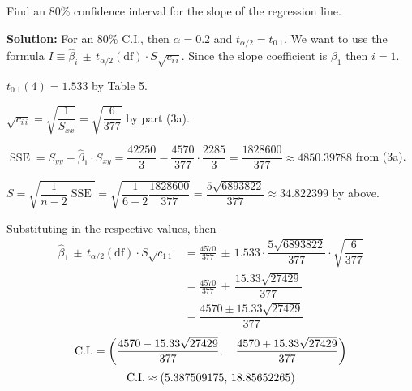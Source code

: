 Find an 80\% confidence interval for the slope of the regression line.

\nl \textbf{Solution: } For an 80\% C.I., then $\alpha = 0.2$ and $t_{\alpha/2} = t_{0.1}$. We want to use the formula $I \equiv \widehat{\beta}_i \,\pm\, t_{\alpha/2}(\text{df})\cdot S \sqrt{c_{i\,i}}$. Since the slope coefficient is $\beta_1$ then $i = 1$. 

\nl $t_{0.1}(4) = 1.533$ by Table 5.

\nl $\sqrt{c_{i\,i}} = \sqrt{\dfrac{1}{S_{xx}}} = \sqrt{\dfrac{6}{377}}$ by part (3a).

\nl $\operatorname{SSE} = S_{yy} - \widehat{\beta}_1 \cdot S_{xy} = \dfrac{42250}{3} - \dfrac{4570}{377}  \cdot \dfrac{2285}{3} = \dfrac{\num{1828600}}{377} \approx 4850.39788$ from (3a).

\nl $S = \sqrt{\dfrac{1}{n-2} \operatorname{SSE}} = \sqrt{\dfrac{1}{6-2} \dfrac{\num{1828600}}{377}} =  \dfrac{5\sqrt{\num{6893822}}}{377} \approx 34.822399$ by above.

\nnl Substituting in the respective values, then
\begin{align*}
    \widehat{\beta}_1 \,\pm\, t_{\alpha/2}(\text{df})\cdot S \sqrt{c_{1\,1}} &= \frac{4570}{377} \,\pm\, 1.533 \cdot \dfrac{5\sqrt{\num{6893822}}}{377} \cdot \sqrt{\dfrac{6}{377}}  \\
    &= \frac{4570}{377} \,\pm\, \dfrac{15.33\sqrt{27429}}{377}\\
    &= \dfrac{4570 \pm 15.33\sqrt{27429}}{377}
\end{align*}
$$\text{C.I.} = \left( {\dfrac{4570 - 15.33\sqrt{27429}}{377}, \quad \dfrac{4570 + 15.33\sqrt{27429}}{377}} \right)$$
$$\text{C.I.} \approx \left( {5.387509175, \, 18.85652265} \right)$$